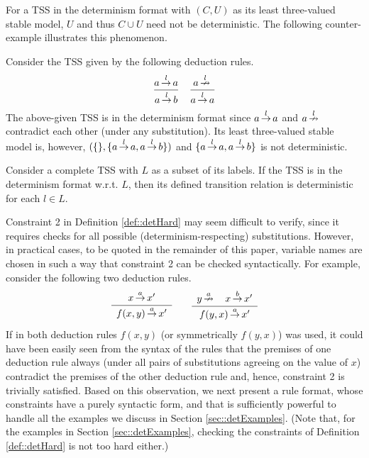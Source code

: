 For a TSS in the determinism format with $(C, U)$ as its least three-valued stable model, $U$ and thus $C \cup U$ need not be deterministic.
The following counter-example illustrates this phenomenon.

\begin{example}
Consider the TSS given by the following deduction rules.
\[
\sosrule[]{a \trans{l} a}{a \trans{l} b} \quad \sosrule[]{a \ntrans{l}}{a \trans{l} a}
\]
The above-given TSS is in the determinism format since $a \,{\stackrel{{l}}{\rightarrow}}\, a$ and $a \,{\stackrel{{l}}{\nrightarrow}}\,$ contradict each other (under any substitution).
Its least three-valued stable model is, however, $(\{\}, \{a \,{\stackrel{{l}}{\rightarrow}}\, a, a \,{\stackrel{{l}}{\rightarrow}}\, b\})$ and $\{a \,{\stackrel{{l}}{\rightarrow}}\, a, a \,{\stackrel{{l}}{\rightarrow}}\, b\}$ is not deterministic.
\end{example}

\begin{corollary}
Consider a complete TSS with $L$ as a subset of its labels. If the TSS is in the determinism format w.r.t. $L$, then its defined transition relation is deterministic for each $l \in L$.
\end{corollary}

Constraint 2 in Definition \ref{def::detHard} may seem difficult to verify,
since it requires checks for all possible (determinism-respecting) substitutions.
However, in practical cases, to be quoted in the remainder of this paper,
variable names are chosen in such a way that constraint 2
can be checked syntactically.
For example, consider the following two deduction rules.
\[
\sosrule{x \trans{a} x'}{f(x,y) \trans{a} x'} \qquad
\sosrule{y \ntrans{a} \quad x \trans{b} x'}{f(y,x) \trans{a} x'}
\]
If in both deduction rules $f(x,y)$ (or symmetrically $f(y,x)$) was used,
it could have been easily seen from the syntax of the rules that the premises of one deduction rule
always (under all pairs of substitutions agreeing on the value of $x$) contradict the premises of the other deduction rule and, hence, constraint 2 is trivially satisfied.
Based on this observation, we next present a rule format, whose constraints
have a purely syntactic form,
and that is sufficiently powerful to handle all the examples we discuss
in Section \ref{sec::detExamples}.
(Note that, for the examples in Section \ref{sec::detExamples}, checking the constraints of Definition \ref{def::detHard} is
not too hard either.)



